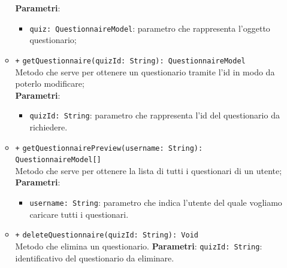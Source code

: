 \begin{itemize}
\begin{itemize}
			\textbf{Parametri}:
			\begin{itemize}
				\item \texttt{quiz: QuestionnaireModel}: parametro che rappresenta l'oggetto questionario;
			\end{itemize}
		\item \texttt{+} \texttt{getQuestionnaire(quizId: String): QuestionnaireModel} \\Metodo che serve per ottenere un questionario tramite l'id in modo da poterlo modificare; \\
			\textbf{Parametri}:
			\begin{itemize}
				\item \texttt{quizId: String}: parametro che rappresenta l'id del questionario da richiedere.
			\end{itemize}
		\item \texttt{+} \texttt{getQuestionnairePreview(username: String): QuestionnaireModel[]} \\ Metodo che serve per ottenere la lista di tutti i questionari di un utente; \\
			\textbf{Parametri}:
			\begin{itemize}
				\item \texttt{username: String}: parametro che indica l'utente del quale vogliamo caricare tutti i questionari.
			\end{itemize}
		\item \texttt{+} \texttt{deleteQuestionnaire(quizId: String): Void} \\Metodo che elimina un questionario.
		\textbf{Parametri}:
		\texttt{quizId: String}: identificativo del questionario da eliminare.
	\end{itemize}
\end{itemize}

